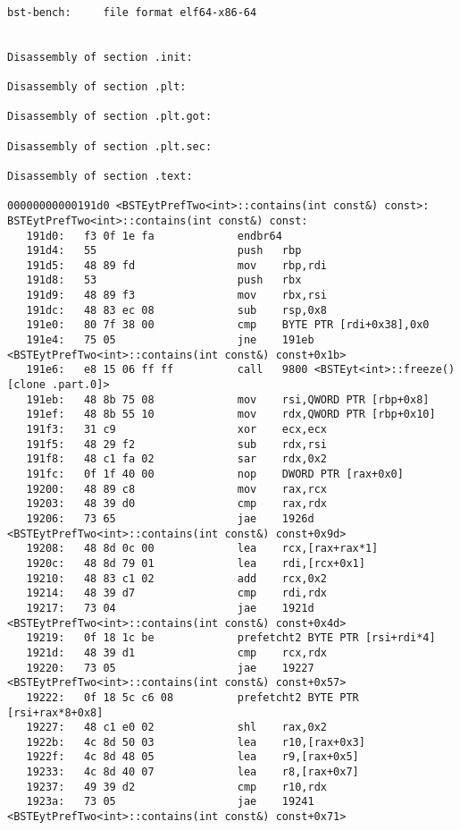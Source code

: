 \begin{lstlisting}

bst-bench:     file format elf64-x86-64


Disassembly of section .init:

Disassembly of section .plt:

Disassembly of section .plt.got:

Disassembly of section .plt.sec:

Disassembly of section .text:

00000000000191d0 <BSTEytPrefTwo<int>::contains(int const&) const>:
BSTEytPrefTwo<int>::contains(int const&) const:
   191d0:	f3 0f 1e fa          	endbr64
   191d4:	55                   	push   rbp
   191d5:	48 89 fd             	mov    rbp,rdi
   191d8:	53                   	push   rbx
   191d9:	48 89 f3             	mov    rbx,rsi
   191dc:	48 83 ec 08          	sub    rsp,0x8
   191e0:	80 7f 38 00          	cmp    BYTE PTR [rdi+0x38],0x0
   191e4:	75 05                	jne    191eb <BSTEytPrefTwo<int>::contains(int const&) const+0x1b>
   191e6:	e8 15 06 ff ff       	call   9800 <BSTEyt<int>::freeze() [clone .part.0]>
   191eb:	48 8b 75 08          	mov    rsi,QWORD PTR [rbp+0x8]
   191ef:	48 8b 55 10          	mov    rdx,QWORD PTR [rbp+0x10]
   191f3:	31 c9                	xor    ecx,ecx
   191f5:	48 29 f2             	sub    rdx,rsi
   191f8:	48 c1 fa 02          	sar    rdx,0x2
   191fc:	0f 1f 40 00          	nop    DWORD PTR [rax+0x0]
   19200:	48 89 c8             	mov    rax,rcx
   19203:	48 39 d0             	cmp    rax,rdx
   19206:	73 65                	jae    1926d <BSTEytPrefTwo<int>::contains(int const&) const+0x9d>
   19208:	48 8d 0c 00          	lea    rcx,[rax+rax*1]
   1920c:	48 8d 79 01          	lea    rdi,[rcx+0x1]
   19210:	48 83 c1 02          	add    rcx,0x2
   19214:	48 39 d7             	cmp    rdi,rdx
   19217:	73 04                	jae    1921d <BSTEytPrefTwo<int>::contains(int const&) const+0x4d>
   19219:	0f 18 1c be          	prefetcht2 BYTE PTR [rsi+rdi*4]
   1921d:	48 39 d1             	cmp    rcx,rdx
   19220:	73 05                	jae    19227 <BSTEytPrefTwo<int>::contains(int const&) const+0x57>
   19222:	0f 18 5c c6 08       	prefetcht2 BYTE PTR [rsi+rax*8+0x8]
   19227:	48 c1 e0 02          	shl    rax,0x2
   1922b:	4c 8d 50 03          	lea    r10,[rax+0x3]
   1922f:	4c 8d 48 05          	lea    r9,[rax+0x5]
   19233:	4c 8d 40 07          	lea    r8,[rax+0x7]
   19237:	49 39 d2             	cmp    r10,rdx
   1923a:	73 05                	jae    19241 <BSTEytPrefTwo<int>::contains(int const&) const+0x71>

\end{lstlisting}
